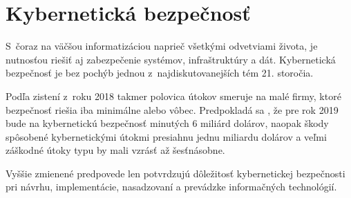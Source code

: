 \chapter{Kybernetická bezpečnosť}

S~čoraz na väčšou informatizáciou naprieč všetkými odvetviami života, je nutnosťou riešiť aj zabezpečenie systémov, infraštruktúry a dát. Kybernetická bezpečnosť je bez pochýb jednou z~najdiskutovanejších tém 21. storočia.
 
Podľa zistení z~roku 2018 \cite{Milkovich3122018} takmer polovica útokov smeruje na malé firmy, ktoré bezpečnosť riešia iba minimálne alebo vôbec. Predpokladá sa \cite{Milkovich3122018}, že pre rok 2019 bude na kybernetickú bezpečnosť minutých 6 miliárd dolárov, naopak škody spôsobené kybernetickými útokmi presiahnu jednu miliardu dolárov a veľmi záškodné útoky typu  by mali vzrásť až šesťnásobne. 

Vyššie zmienené predpovede len potvrdzujú dôležitosť kybernetickej  bezpečnosti pri návrhu, implementácie, nasadzovaní a prevádzke informačných technológií.




